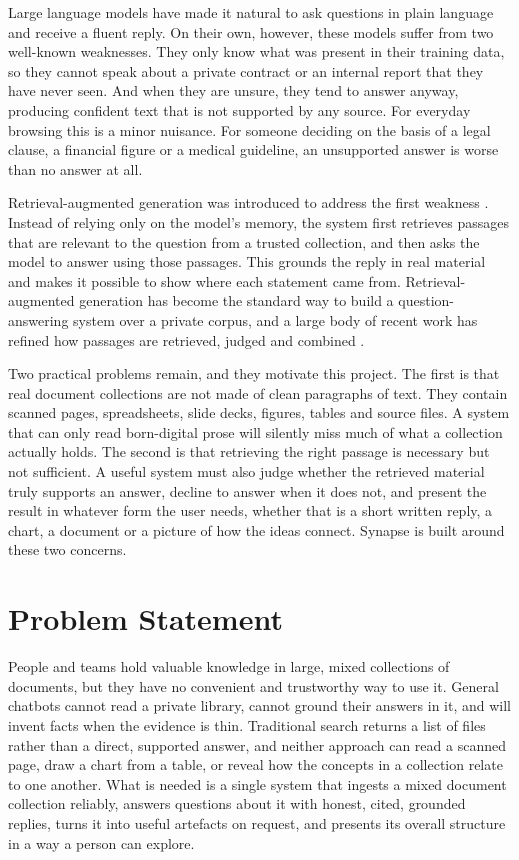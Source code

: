 Large language models have made it natural to ask questions in plain language
and receive a fluent reply. On their own, however, these models suffer from two
well-known weaknesses. They only know what was present in their training data,
so they cannot speak about a private contract or an internal report that they
have never seen. And when they are unsure, they tend to answer anyway, producing
confident text that is not supported by any source. For everyday browsing this
is a minor nuisance. For someone deciding on the basis of a legal clause, a
financial figure or a medical guideline, an unsupported answer is worse than no
answer at all.

Retrieval-augmented generation was introduced to address the first weakness
\cite{lewis2020rag}. Instead of relying only on the model's memory, the system
first retrieves passages that are relevant to the question from a trusted
collection, and then asks the model to answer using those passages. This grounds
the reply in real material and makes it possible to show where each statement
came from. Retrieval-augmented generation has become the standard way to build a
question-answering system over a private corpus, and a large body of recent work
has refined how passages are retrieved, judged and combined
\cite{yan2024crag,asai2024selfrag,nguyen2025marag}.

Two practical problems remain, and they motivate this project. The first is that
real document collections are not made of clean paragraphs of text. They contain
scanned pages, spreadsheets, slide decks, figures, tables and source files. A
system that can only read born-digital prose will silently miss much of what a
collection actually holds. The second is that retrieving the right passage is
necessary but not sufficient. A useful system must also judge whether the
retrieved material truly supports an answer, decline to answer when it does not,
and present the result in whatever form the user needs, whether that is a short
written reply, a chart, a document or a picture of how the ideas connect. Synapse
is built around these two concerns.

\section{Problem Statement}

People and teams hold valuable knowledge in large, mixed collections of
documents, but they have no convenient and trustworthy way to use it. General
chatbots cannot read a private library, cannot ground their answers in it, and
will invent facts when the evidence is thin. Traditional search returns a list
of files rather than a direct, supported answer, and neither approach can read a
scanned page, draw a chart from a table, or reveal how the concepts in a
collection relate to one another. What is needed is a single system that ingests
a mixed document collection reliably, answers questions about it with honest,
cited, grounded replies, turns it into useful artefacts on request, and presents
its overall structure in a way a person can explore.

